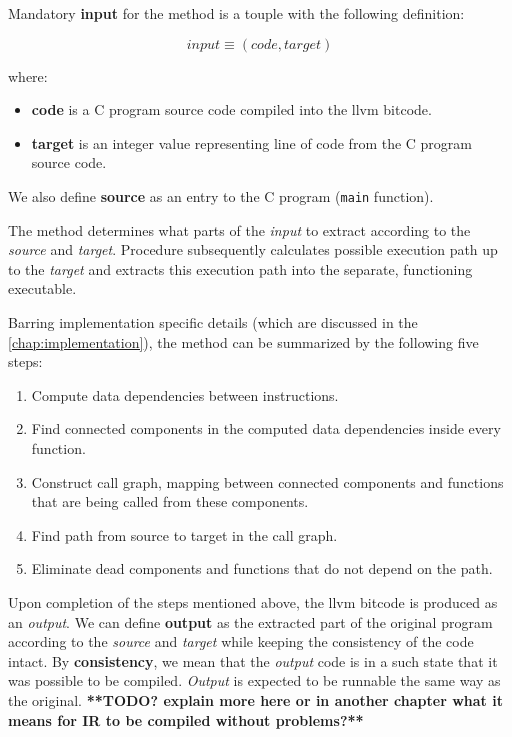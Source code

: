 \documentclass[12pt, twoside]{fithesis2}
\renewcommand{\_}{\leavevmode \kern0.07em\vbox{\hrule width0.4em}}
\newcommand{\squarebullet}{\textcolor{black}{\raisebox{0.15em}{\rule{4pt}{4pt}}}}
\newenvironment{myItemize}{
  \begin{itemize}[
    leftmargin=2em,
    rightmargin=1em,
    itemsep=\parskip,
    parsep=0em,
    topsep=0em,
    partopsep=0em
]
  \renewcommand{\labelitemi}{\squarebullet}
  \renewcommand{\labelitemii}{\textbullet}
}{
  \end{itemize}
}
\newenvironment{myEnumerate}{
  \begin{enumerate}[
    leftmargin=2em,
    rightmargin=1em,
    itemsep=\parskip,
    parsep=0em,
    topsep=0em,
    partopsep=0em
]
}{
  \end{enumerate}
}
\begin{document}
Mandatory \textbf{input} for the method is a touple with the following
definition:

$$
input \equiv (code, target)
$$

where:
\begin{myItemize}
\item \textbf{code} is a C program source code compiled into the llvm bitcode.
\item \textbf{target} is an integer value representing line of code from the
C program source code.
\end{myItemize}

We also define \textbf{source} as an entry to the C program
(\texttt{main} function).


The method determines what parts of the \emph{input} to extract according to
the \emph{source} and \emph{target}.
Procedure subsequently calculates possible execution path up to the
\emph{target} and extracts this execution path into the separate, functioning
executable.

Barring implementation specific details (which are discussed in the
\autoref{chap:implementation}), the method can be summarized by the following
five steps:

\begin{myEnumerate}
\item Compute data dependencies between instructions.
\item Find connected components in the computed data dependencies inside
every function.
\item Construct call graph, mapping between connected components and functions
that are being called from these components.
\item Find path from source to target in the call graph.
\item Eliminate dead components and functions that do not depend on the path.
\end{myEnumerate}

Upon completion of the steps mentioned above, the llvm bitcode is produced as
an \emph{output}.
We can define \textbf{output} as the extracted part of the original program
according to the \emph{source} and \emph{target} while keeping the consistency
of the code intact.
By \textbf{consistency}, we mean that the \emph{output} code is in a such state
that it was possible to be compiled.
\emph{Output} is expected to be runnable the same way as
the original.
\textbf{**TODO? explain more here or in another chapter what it means for IR to
be compiled without problems?**}
\end{document}
